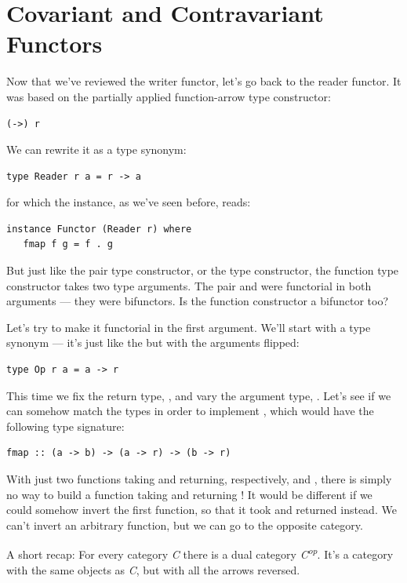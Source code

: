 \section{Covariant and Contravariant
Functors}\label{covariant-and-contravariant-functors}

Now that we've reviewed the writer functor, let's go back to the reader
functor. It was based on the partially applied function-arrow type
constructor:

\begin{verbatim}
(->) r
\end{verbatim}
We can rewrite it as a type synonym:

\begin{verbatim}
type Reader r a = r -> a
\end{verbatim}
for which the  instance, as we've seen before, reads:

\begin{verbatim}
instance Functor (Reader r) where
   fmap f g = f . g
\end{verbatim}
But just like the pair type constructor, or the  type
constructor, the function type constructor takes two type arguments. The
pair and  were functorial in both arguments --- they were
bifunctors. Is the function constructor a bifunctor too?

Let's try to make it functorial in the first argument. We'll start with
a type synonym --- it's just like the  but with the
arguments flipped:

\begin{verbatim}
type Op r a = a -> r
\end{verbatim}
This time we fix the return type, , and vary the argument
type, . Let's see if we can somehow match the types in order
to implement , which would have the following type
signature:

\begin{verbatim}
fmap :: (a -> b) -> (a -> r) -> (b -> r)
\end{verbatim}
With just two functions taking  and returning, respectively,
 and , there is simply no way to build a function
taking  and returning ! It would be different if we
could somehow invert the first function, so that it took  and
returned  instead. We can't invert an arbitrary function, but
we can go to the opposite category.

A short recap: For every category \emph{C} there is a dual category
\emph{C\textsuperscript{op}}. It's a category with the same objects as
\emph{C}, but with all the arrows reversed.

